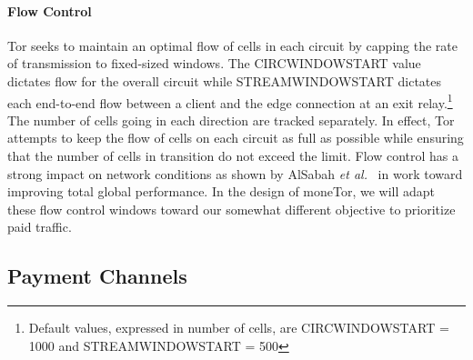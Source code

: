 \paragraph*{Flow Control} Tor seeks to maintain an optimal flow of cells in
each circuit by capping the rate of transmission to fixed-sized windows. The
CIRCWINDOWSTART value dictates flow for the overall circuit while
STREAMWINDOWSTART dictates each end-to-end flow between a client and the edge
connection at an exit relay.\footnote{Default values, expressed in number of
  cells, are CIRCWINDOWSTART = 1000 and STREAMWINDOWSTART = 500} The number of
cells going in each direction are tracked separately. In effect, Tor attempts to
keep the flow of cells on each circuit as full as possible while ensuring that
the number of cells in transition do not exceed the limit. Flow control has a
strong impact on network conditions as shown by AlSabah \textit{et
  al.}~\cite{pets2011-defenestrator} in work toward improving total global
performance.  In the design of moneTor, we will adapt these flow control windows
toward our somewhat different objective to prioritize paid traffic.

\subsection{Payment Channels}

%

